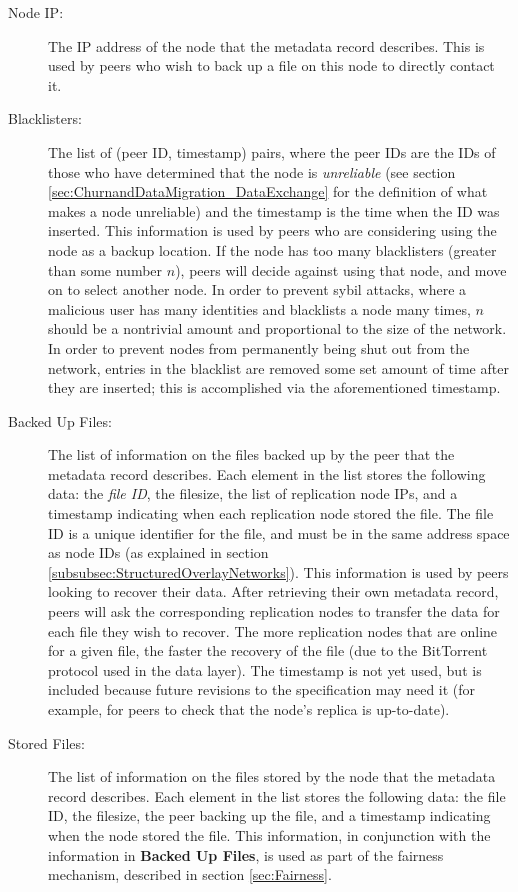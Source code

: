 \documentclass[12pt]{report}
\begin{document}
\begin{description}
  \item[Node IP:] The IP address of the node that the metadata record describes. This is used by peers who wish to back up a file on this node to directly contact it.
  \item[Blacklisters:] The list of (peer ID, timestamp) pairs, where the peer IDs are the IDs of those who have determined that the node is \textit{unreliable} (see section \ref{sec:ChurnandDataMigration_DataExchange} for the definition of what makes a node unreliable) and the timestamp is the time when the ID was inserted. This information is used by peers who are considering using the node as a backup location. If the node has too many blacklisters (greater than some number $n$), peers will decide against using that node, and move on to select another node. In order to prevent sybil attacks, where a malicious user has many identities and blacklists a node many times, $n$ should be a nontrivial amount and proportional to the size of the network. In order to prevent nodes from permanently being shut out from the network, entries in the blacklist are removed some set amount of time after they are inserted; this is accomplished via the aforementioned timestamp.
  \item[Backed Up Files:] The list of information on the files backed up by the peer that the metadata record describes. Each element in the list stores the following data: the \textit{file ID}, the filesize, the list of replication node IPs, and a timestamp indicating when each replication node stored the file. The file ID is a unique identifier for the file, and must be in the same address space as node IDs (as explained in section \ref{subsubsec:StructuredOverlayNetworks}). This information is used by peers looking to recover their data. After retrieving their own metadata record, peers will ask the corresponding replication nodes to transfer the data for each file they wish to recover. The more replication nodes that are online for a given file, the faster the recovery of the file (due to the BitTorrent protocol used in the data layer). The timestamp is not yet used, but is included because future revisions to the specification may need it (for example, for peers to check that the node's replica is up-to-date).
  \item[Stored Files:] The list of information on the files stored by the node that the metadata record describes. Each element in the list stores the following data: the file ID, the filesize, the peer backing up the file, and a timestamp indicating when the node stored the file. This information, in conjunction with the information in \textbf{Backed Up Files}, is used as part of the fairness mechanism, described in section \ref{sec:Fairness}.
\end{description}
\end{document}
